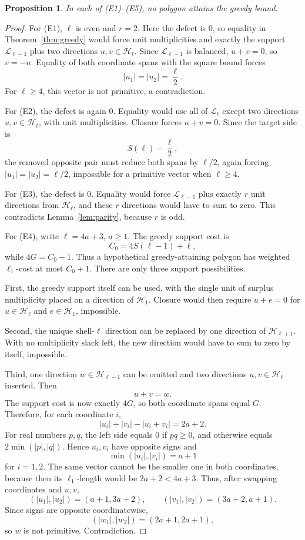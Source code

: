 \documentclass[11pt]{article}
\newtheorem{proposition}[theorem]{Proposition}
\theoremstyle{definition}
\newcommand{\HH}{\mathcal H}
\newcommand{\LL}{\mathcal L}
\begin{document}
\begin{proposition}\label{prop:nonattain}
In each of \textup{(E1)}--\textup{(E5)}, no polygon attains the greedy bound.
\end{proposition}

\begin{proof}
For (E1), \(\ell\) is even and \(r=2\).  Here the defect is \(0\), so equality in Theorem~\ref{thm:greedy} would force unit multiplicities and exactly the support
\(\LL_{\ell-1}\) plus two directions \(u,v\in\HH_\ell\).  Since \(\LL_{\ell-1}\) is balanced, \(u+v=0\), so \(v=-u\).  Equality of both coordinate spans with the square bound forces
\[
|u_1|=|u_2|=\frac{\ell}{2}.
\]
For \(\ell\ge4\), this vector is not primitive, a contradiction.

For (E2), the defect is again \(0\).  Equality would use all of \(\LL_\ell\) except two directions \(u,v\in\HH_\ell\), with unit multiplicities.  Closure forces \(u+v=0\).  Since the target side is
\[
S(\ell)-\frac{\ell}{2},
\]
the removed opposite pair must reduce both spans by \(\ell/2\), again forcing
\(|u_1|=|u_2|=\ell/2\), impossible for a primitive vector when \(\ell\ge4\).

For (E3), the defect is \(0\).  Equality would force \(\LL_{\ell-1}\) plus exactly \(r\) unit directions from \(\HH_\ell\), and these \(r\) directions would have to sum to zero.  This contradicts Lemma~\ref{lem:parity}, because \(r\) is odd.

For (E4), write \(\ell=4a+3\), \(a\ge1\).  The greedy support cost is
\[
C_0=4S(\ell-1)+\ell,
\]
while \(4G=C_0+1\).  Thus a hypothetical greedy-attaining polygon has weighted \(\ell_1\)-cost at most \(C_0+1\).  There are only three support possibilities.

First, the greedy support itself can be used, with the single unit of surplus multiplicity placed on a direction of \(\HH_1\).  Closure would then require \(u+e=0\) for
\(u\in\HH_\ell\) and \(e\in\HH_1\), impossible.

Second, the unique shell-\(\ell\) direction can be replaced by one direction of \(\HH_{\ell+1}\).  With no multiplicity slack left, the new direction would have to sum to zero by itself, impossible.

Third, one direction
\(w\in\HH_{\ell-1}\) can be omitted and two directions \(u,v\in\HH_\ell\) inserted.  Then
\[
u+v=w.
\]
The support cost is now exactly \(4G\), so both coordinate spans equal \(G\).  Therefore, for each coordinate \(i\),
\[
|u_i|+|v_i|-|u_i+v_i|=2a+2.
\]
For real numbers \(p,q\), the left side equals \(0\) if \(pq\ge0\), and otherwise equals \(2\min(|p|,|q|)\).  Hence \(u_i,v_i\) have opposite signs and
\[
\min(|u_i|,|v_i|)=a+1
\]
for \(i=1,2\).  The same vector cannot be the smaller one in both coordinates, because then its \(\ell_1\)-length would be \(2a+2<4a+3\).  Thus, after swapping coordinates and \(u,v\),
\[
(|u_1|,|u_2|)=(a+1,3a+2),\qquad
(|v_1|,|v_2|)=(3a+2,a+1).
\]
Since signs are opposite coordinatewise,
\[
(|w_1|,|w_2|)=(2a+1,2a+1),
\]
so \(w\) is not primitive.  Contradiction.


\end{proof}
\end{document}
